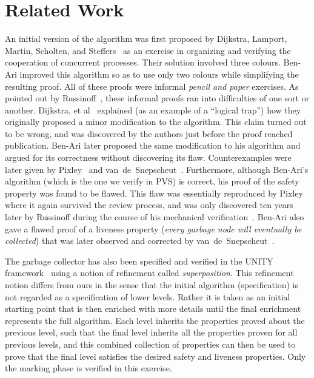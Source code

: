 
\section{Related Work}
\label{sec:related-work}

An initial  version of the algorithm  was  first proposed by Dijkstra,
Lamport, Martin, Scholten, and Steffers~\cite{DLMSS:GC} as an exercise
in  organizing and verifying the cooperation  of concurrent processes. 
Their solution   involved   three  colours.   Ben-Ari    improved this
algorithm so  as  to use    only  two colours  while  simplifying  the
resulting proof.  All of these  proofs were  informal {\em pencil  and
  paper\/} exercises.  As   pointed  out by   Russinoff~\cite{Rus:GC},
these informal proofs  ran into difficulties  of one sort or  another. 
Dijkstra, et al~\cite{DLMSS:GC}    explained   (as an  example  of   a
``logical trap'') how they originally proposed a minor modification to
the  algorithm.   This claim turned   out  to   be  wrong, and  was
discovered by the authors just  before the proof reached publication.  
Ben-Ari  later  proposed the same  modification   to his algorithm and
argued for   its    correctness   without  discovering its       flaw. 
Counterexamples    were  later  given    by  Pixley~\cite{Pix:GC}  and
van~de~Snepscheut~\cite{Van:GC}.   Furthermore,  although    Ben-Ari's
algorithm (which is the one we verify in PVS) is correct, his proof of
the safety property was found to be flawed.  This flaw was essentially
reproduced by Pixley \cite{Pix:GC} where it  again survived the  review
process, and was only discovered  ten years later by Russinoff  during
the course of his mechanical verification~\cite{Rus:GC}.  Ben-Ari also
gave a flawed  proof of a liveness  property ({\em every garbage  node
  will eventually be collected}) that was later observed and corrected
by van~de~Snepscheut~\cite{Van:GC}.

The garbage collector  has  also been  specified  and 
verified in  the
UNITY  framework~\cite{CM:UNITY} using a  notion of  
refinement called
{\em superposition}.  This refinement notion differs  from 
ours in the
sense that the initial algorithm (specification)  is not 
regarded as a
specification of lower levels.   Rather   it is  taken as 
an   initial
starting point that is then enriched with more details 
until the final
enrichment   represents the full   algorithm.  Each level 
inherits the
properties proved about the previous  level, such that the 
final level
inherits  all the properties proven  for all previous 
levels, and this
combined collection of  properties can then be used  to 
prove that the
final level satisfies  the desired  safety  and liveness  
properties.  
Only the marking phase is verified in this exercise.

